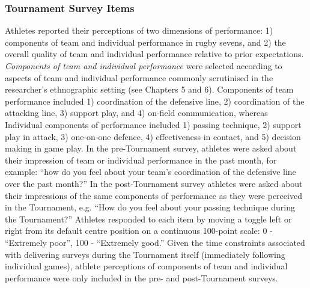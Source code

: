  \subsubsection{\label{Section:Tournament Survey Items}Tournament Survey Items}


Athletes reported their perceptions of two dimensions of performance: 1) components of team and individual performance in rugby sevens, and 2) the overall quality of team and individual performance relative to prior expectations.  \textit{Components of team and individual performance} were selected according to aspects of team and  individual performance commonly scrutinised in the researcher's ethnographic setting (see Chapters 5 and 6).  Components of team performance included 1) coordination of the defensive line, 2) coordination of the attacking line, 3) support play, and 4) on-field communication, whereas Individual components of performance included 1) passing technique, 2) support play in attack, 3) one-on-one defence, 4) effectiveness in contact, and 5) decision making in game play.  In the pre-Tournament survey, athletes were asked about their impression of team or individual performance in the past month, for example: ``how do you feel about your team's coordination of the defensive line over the past month?''  In the post-Tournament survey athletes were asked about their impressions of the same components of performance as they were perceived in the Tournament, e.g. ``How do you feel about your passing technique during the Tournament?'' Athletes responded to each item by moving a toggle left or right from its default centre position on a continuous 100-point scale: 0 - ``Extremely poor'', 100 - ``Extremely good.''  Given the time constraints associated with delivering surveys during the Tournament itself (immediately following individual games), athlete perceptions of components of team and individual performance were only included in the pre- and post-Tournament surveys.

